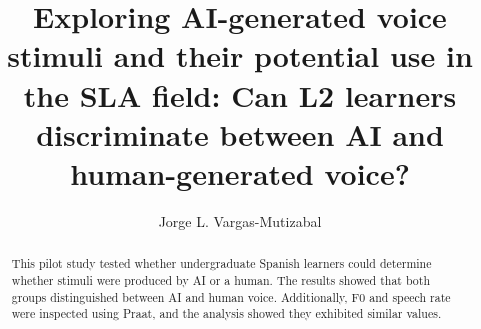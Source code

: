\title{Exploring AI-generated voice stimuli and their potential use in the SLA field: Can L2 learners discriminate between AI and human-generated voice?}
\author{Jorge L. Vargas-Mutizabal}


\maketitle

\begin{abstract}
This pilot study tested whether undergraduate Spanish learners could determine whether stimuli were produced by AI or a human. The results showed that both groups distinguished between AI and human voice. Additionally, F0 and speech rate were inspected using Praat, and the analysis showed they exhibited similar values. 



\end{abstract}


